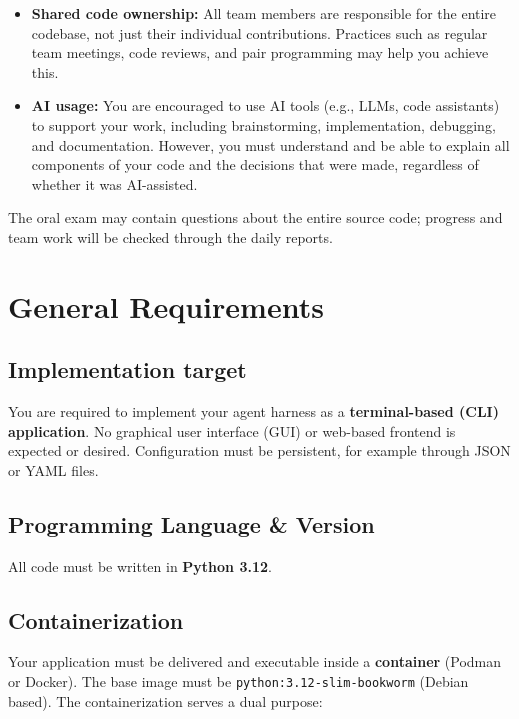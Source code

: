 \documentclass{article}
\begin{document}
\begin{itemize}
    \item \textbf{Shared code ownership:} All team members are responsible for the entire codebase, not just their individual contributions. Practices such as regular team meetings, code reviews, and pair programming may help you achieve this.
    \item \textbf{AI usage:} You are encouraged to use AI tools (e.g., LLMs, code assistants) to support your work, including brainstorming, implementation, debugging, and documentation. However, you must understand and be able to explain all components of your code and the decisions that were made, regardless of whether it was AI-assisted. 
\end{itemize}

\noindent The oral exam may contain questions about the entire source code; progress and team work will be checked through the daily reports.

\section{General Requirements}

\subsection{Implementation target}

You are required to implement your agent harness as a \textbf{terminal-based (CLI) application}. No graphical user interface (GUI) or web-based frontend is expected or desired. Configuration must be persistent, for example through JSON or YAML files.

\subsection{Programming Language \& Version}
All code must be written in \textbf{Python 3.12}.

\subsection{Containerization}

Your application must be delivered and executable inside a \textbf{container} (Podman or Docker). The base image must be \texttt{python:3.12-slim-bookworm} (Debian based). The containerization serves a dual purpose:
\end{document}
